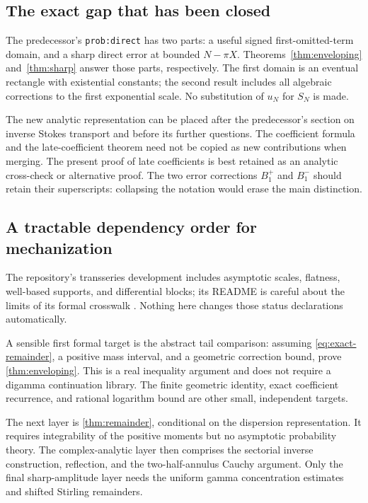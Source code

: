 \documentclass[11pt,a4paper]{article}
\theoremstyle{definition}
\numberwithin{equation}{section}
\begin{document}
\subsection{The exact gap that has been closed}
The predecessor's \texttt{prob:direct} has two parts: a useful signed
first-omitted-term domain, and a sharp direct error at bounded
$N-\pi X$. Theorems~\ref{thm:enveloping} and~\ref{thm:sharp} answer those
parts, respectively. The first domain is an eventual rectangle with
existential constants; the second result includes all algebraic corrections
to the first exponential scale. No substitution of $u_N$ for $S_N$ is made.

The new analytic representation can be placed after the predecessor's
section on inverse Stokes transport and before its further questions.
The coefficient formula and the late-coefficient theorem need not be
copied as new contributions when merging. The present proof of late
coefficients is best retained as an analytic cross-check or alternative
proof. The two error corrections $B_1^+$ and $B_1^-$ should retain their
superscripts: collapsing the notation would erase the main distinction.

\subsection{A tractable dependency order for mechanization}
The repository's transseries development includes asymptotic scales,
flatness, well-based supports, and differential blocks; its README is
careful about the limits of its formal crosswalk \cite{groupreadme}.
Nothing here changes those status declarations automatically.

A sensible first formal target is the abstract tail comparison: assuming
\eqref{eq:exact-remainder}, a positive mass interval, and a geometric
correction bound, prove \cref{thm:enveloping}. This is a real inequality
argument and does not require a digamma continuation library. The finite
geometric identity, exact coefficient recurrence, and rational logarithm
bound are other small, independent targets.

The next layer is \cref{thm:remainder}, conditional on the dispersion
representation. It requires integrability of the positive moments but no
asymptotic probability theory. The complex-analytic layer then comprises
the sectorial inverse construction, reflection, and the two-half-annulus
Cauchy argument. Only the final sharp-amplitude layer needs the uniform
gamma concentration estimates and shifted Stirling remainders.
\end{document}
